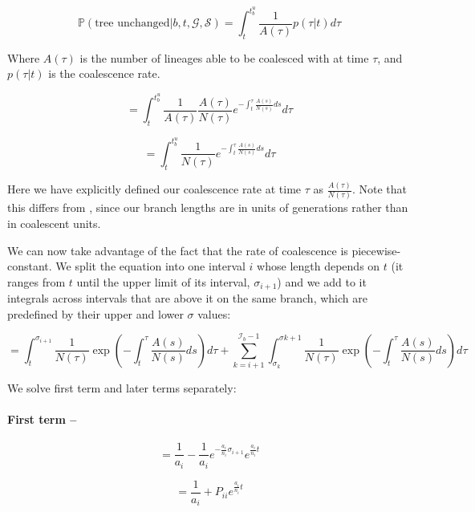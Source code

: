 \documentclass[11pt]{article}
\begin{document}
\begin{equation}
	\mathbb{P}(\textrm{tree unchanged} | b,t,\mathcal{G},\mathcal{S}) = \int_{t}^{t^u_b}\frac{1}{A(\tau)}p(\tau|t)d\tau
\end{equation}

Where $A(\tau)$ is the number of lineages able to be coalesced with at time $\tau$, and $p(\tau|t)$ is the coalescence rate.

\begin{equation}
	= \int_{t}^{t^u_b}\frac{1}{A(\tau)} \frac{A(\tau)}{N(\tau)}e^{-\int_t^\tau{}\frac{A(s)}{N(s)}ds} d\tau
\end{equation}


\begin{equation}
	= \int_{t}^{t^u_b}\frac{1}{N(\tau)}e^{-\int_t^\tau{}\frac{A(s)}{N(s)}ds} d\tau
\end{equation}

Here we have explicitly defined our coalescence rate at time $\tau$ as $\frac{A(\tau)}{N(\tau)}$. Note that this differs from \citet{deng_distribution_2021}, since our branch lengths are in units of generations rather than in coalescent units. 

We can now take advantage of the fact that the rate of coalescence is piecewise-constant. We split the equation into one interval $i$ whose length depends on $t$ (it ranges from $t$ until the upper limit of its interval, $\sigma_{i+1}$) and we add to it integrals across intervals that are above it on the same branch, which are predefined by their upper and lower $\sigma$ values:

\begin{equation}
	= \int_{t}^{\sigma_{i+1}} \frac{1}{N(\tau)}\exp\left(-\int_{t}^{\tau}\frac{A(s)}{N(s)}ds\right)d\tau + \sum_{k=i+1}^{\mathcal{I}_b-1}\int_{\sigma_{k}}^{\sigma{k+1}}\frac{1}{N(\tau)}\exp\left(-\int_{t}^{\tau}\frac{A(s)}{N(s)}ds\right)d\tau
\end{equation}

We solve first term and later terms separately:

\paragraph{First term --}

\begin{equation}
	= \frac{1}{a_i} - \frac{1}{a_i}e^{-\frac{a_i}{n_i}\sigma_{i+1}}e^{\frac{a_i}{n_i}t}
\end{equation}

\begin{equation}
	= \frac{1}{a_i} +P_{ii}e^{\frac{a_i}{n_i}t}
\end{equation}
\end{document}
